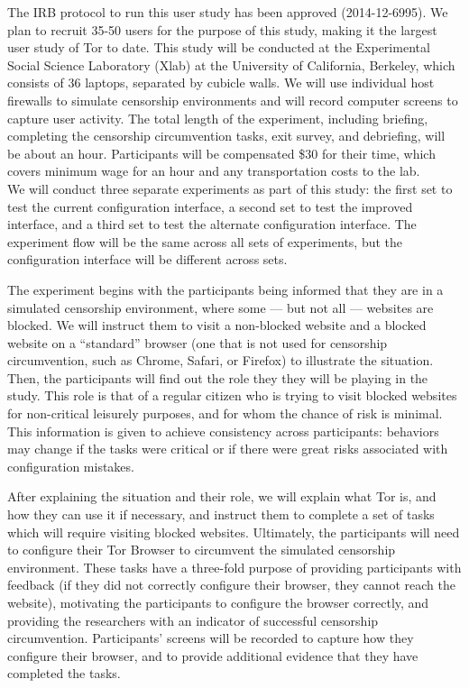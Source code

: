 \documentclass{template}
\begin{document}
The IRB protocol to run this user study has been approved (2014-12-6995). 
We plan to recruit 35-50 users for the purpose of this study,
making it the largest user study of Tor to date.  This study will be conducted at the
Experimental Social Science Laboratory (Xlab)
at the University of California, Berkeley, which consists of 36 laptops,
separated by cubicle walls. We will use individual host firewalls to simulate
censorship environments and will record computer screens to capture 
user activity. The total length of the experiment, including briefing, completing the censorship 
circumvention tasks, exit survey, and debriefing, will be about an hour.
Participants will be compensated \$30 for their time, which covers
minimum wage for an hour and any transportation costs to the lab.  \\

We will conduct three separate experiments as part of this study:
the first set to test the current configuration
interface, a second set to test the improved interface, and a third set to test the 
alternate configuration interface. The experiment flow will be the same across all 
sets of experiments, but the configuration interface will be different across sets. 

The experiment begins with the participants being informed that they are in a
simulated censorship
environment, where some --- but not all --- websites are blocked. We will
instruct them to visit a non-blocked website and a blocked website on a
``standard'' browser (one that is not used for censorship circumvention, such
as Chrome, Safari, or Firefox) to illustrate the situation.
Then, the participants will find out the role they they will be playing in the study.
This role is that of a regular citizen who is trying to visit blocked websites
for non-critical leisurely purposes,
and for whom the chance of risk is minimal. This information is given
to achieve
consistency across participants: behaviors may change if the tasks were 
critical or if there were great risks associated with configuration mistakes. 

After explaining the situation and their role, we will explain what Tor is, and
how they can use it if necessary, and instruct them to complete a set of
tasks which will require visiting blocked websites. Ultimately, the
participants will need to configure their Tor Browser to circumvent the
simulated censorship environment. These tasks have a three-fold purpose of
providing participants with feedback (if they did not correctly configure their
browser, they cannot reach the website),  motivating the participants to
configure the browser correctly, and providing the researchers with an
indicator of successful censorship circumvention.
Participants' screens will be recorded to capture how they configure
their browser, and to provide additional evidence that they have completed the
tasks.
\end{document}

